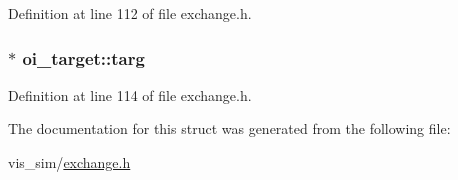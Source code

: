 Definition at line 112 of file exchange.h.

\hypertarget{structoi__target_a3e9d0fce0b93d3fc406c74d5ca664bff}{
\subsubsection[{targ}]{$\ast$ {\bf oi\_\-target::targ}}}
\label{structoi__target_a3e9d0fce0b93d3fc406c74d5ca664bff}


Definition at line 114 of file exchange.h.



The documentation for this struct was generated from the following file:\begin{DoxyCompactItemize}
\item 
vis\_\-sim/\hyperlink{exchange_8h}{exchange.h}\end{DoxyCompactItemize}
